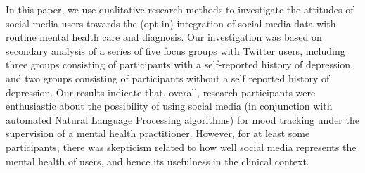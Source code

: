 In this paper, we use qualitative research methods to investigate the attitudes of social media users towards the (opt-in) integration of social media data with routine mental health care and diagnosis. Our investigation was based on secondary analysis of a series of five focus groups with Twitter users, including three groups consisting of participants with a self-reported history of depression, and two groups consisting of participants without a self reported history of depression. Our results indicate that, overall, research participants were enthusiastic about the possibility of using social media (in conjunction with automated Natural Language Processing algorithms) for mood tracking under the supervision of a mental health practitioner. However, for at least some participants, there was skepticism related to how well social media represents the mental health of users, and hence its usefulness in the clinical context.
